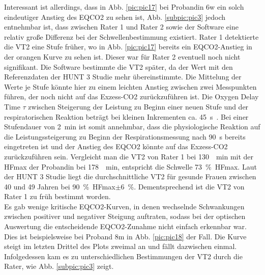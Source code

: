 Interessant ist allerdings, dass in Abb. \ref{pic:pic17} bei Probandin 6w ein solch eindeutiger Anstieg des \gls{EQCO2} zu sehen ist, Abb. \ref{subpic:pic3} jedoch entnehmbar ist, dass zwischen Rater 1 und Rater 2 sowie der Software eine relativ große Differenz bei der Schwellenbestimmung existiert. Rater 1 detektierte die VT2 eine Stufe früher, wo in Abb. \ref{pic:pic17} bereits ein \gls{EQCO2}-Anstieg in der orangen Kurve zu sehen ist. Dieser war für Rater 2 eventuell noch nicht signifikant. Die Software bestimmte die VT2 später, da der Wert mit den Referenzdaten der HUNT 3 Studie mehr übereinstimmte. Die Mittelung der Werte je Stufe könnte hier zu einem leichten Anstieg zwischen zwei Messpunkten führen, der noch nicht auf das Exzess-\gls{CO2} zurückzuführen ist. Die Oxygen Delay Time $\tau$ zwischen Steigerung der Leistung zu Beginn einer neuen Stufe und der respiratorischen Reaktion beträgt bei kleinen Inkrementen ca. \SI{45}{\second}~\cite{Kroidl.2015}. Bei einer Stufendauer von \SI{2}{\minute} ist somit annehmbar, dass die physiologische Reaktion auf die Leistungssteigerung zu Beginn der Respirationsmessung nach \SI{90}{\second} bereits eingetreten ist und der Anstieg des \gls{EQCO2} könnte auf das Exzess-\gls{CO2} zurückzuführen sein. Vergleicht man die VT2 von Rater 1 bei \SI{130}{\per\minute} mit der \gls{HFmax} der Probandin bei \SI{178}{\per\minute}, entspricht die Schwelle 73~\%~\gls{HFmax}. Laut der HUNT 3 Studie liegt die durchschnittliche VT2 für gesunde Frauen zwischen 40 und 49 Jahren bei 90~\%~\gls{HFmax}$\pm$6~\%. Dementsprechend ist die VT2 von Rater 1 zu früh bestimmt worden.\\
Es gab wenige kritische \gls{EQCO2}-Kurven, in denen wechselnde Schwankungen zwischen positiver und negativer Steigung auftraten, sodass bei der optischen Auswertung die entscheidende \gls{EQCO2}-Zunahme nicht einfach erkennbar war. Dies ist beispielsweise bei Proband 8m in Abb. \ref{pic:pic18} der Fall. Die Kurve steigt im letzten Drittel des Plots zweimal an und fällt dazwischen einmal. Infolgedessen kam es zu unterschiedlichen Bestimmungen der VT2 durch die Rater, wie Abb. \ref{subpic:pic3} zeigt.
%
